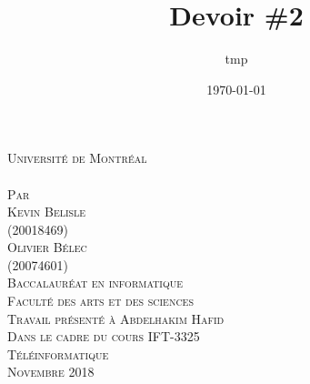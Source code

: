 \documentclass[a4paper,12pt]{article}
\date{\today}
\title{Devoir \#2}
\author{tmp}
\newcommand{\Author}{Kevin Belisle}
\newcommand{\Authorr}{Olivier Bélec}
\newcommand{\MatriculeAuthor}{20018469}
\newcommand{\MatriculeAuthorr}{20074601}
\newcommand{\Teacher}{Abdelhakim Hafid}
\newcommand{\ClassNum}{IFT-3325}
\newcommand{\ClassName}{Téléinformatique}
\newcommand{\DateMMMMYYYY}{Novembre 2018}
\begin{document}
	\begin{titlepage} 
		\begin{center}
			\textsc{\normalsize Université de Montréal}\\[3cm]
			 
			\textsc{\LARGE \@title}\\[2.5cm]
			
			\textsc{\small Par}\\[0.25cm]
			\textsc{\LARGE \Author}\\[0.25cm]
			\textsc{\normalsize (\MatriculeAuthor)}\\[0.25cm]
			\textsc{\LARGE \Authorr}\\[0.25cm]
			\textsc{\normalsize (\MatriculeAuthorr)}\\[2.25cm]
			
			\textsc{\normalsize Baccalauréat en informatique}\\
			\textsc{\normalsize Faculté des arts et des sciences}\\[2.5cm]
			
			\textsc{\small Travail présenté à \Teacher}\\
			\textsc{\small Dans le cadre du cours \ClassNum}\\
			\textsc{\small \ClassName}\\[2.75cm]
			
			\textsc{\normalsize \DateMMMMYYYY}\\[1.5cm]
		\end{center}
	\end{titlepage}
\end{document}
